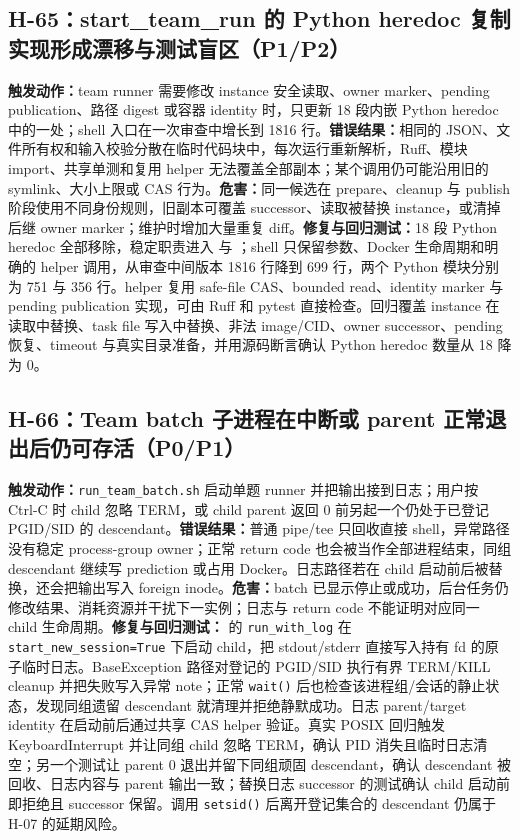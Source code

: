 \documentclass[11pt,a4paper,fontset=fandol]{ctexart}
\newcommand{\code}[1]{\texttt{#1}}
\begin{document}
\subsection{H-65：start\_team\_run 的 Python heredoc 复制实现形成漂移与测试盲区（P1/P2）}

\textbf{触发动作：}team runner 需要修改 instance 安全读取、owner marker、pending publication、路径 digest 或容器 identity 时，只更新 18 段内嵌 Python heredoc 中的一处；shell 入口在一次审查中增长到 1816 行。\textbf{错误结果：}相同的 JSON、文件所有权和输入校验分散在临时代码块中，每次运行重新解析，Ruff、模块 import、共享单测和复用 helper 无法覆盖全部副本；某个调用仍可能沿用旧的 symlink、大小上限或 CAS 行为。\textbf{危害：}同一候选在 prepare、cleanup 与 publish 阶段使用不同身份规则，旧副本可覆盖 successor、读取被替换 instance，或清掉后继 owner marker；维护时增加大量重复 diff。\textbf{修复与回归测试：}18 段 Python heredoc 全部移除，稳定职责进入  与 ；shell 只保留参数、Docker 生命周期和明确的 helper 调用，从审查中间版本 1816 行降到 699 行，两个 Python 模块分别为 751 与 356 行。helper 复用 safe-file CAS、bounded read、identity marker 与 pending publication 实现，可由 Ruff 和 pytest 直接检查。回归覆盖 instance 在读取中替换、task file 写入中替换、非法 image/CID、owner successor、pending 恢复、timeout 与真实目录准备，并用源码断言确认 Python heredoc 数量从 18 降为 0。

\subsection{H-66：Team batch 子进程在中断或 parent 正常退出后仍可存活（P0/P1）}

\textbf{触发动作：}\code{run\_team\_batch.sh} 启动单题 runner 并把输出接到日志；用户按 Ctrl-C 时 child 忽略 TERM，或 child parent 返回 0 前另起一个仍处于已登记 PGID/SID 的 descendant。\textbf{错误结果：}普通 pipe/tee 只回收直接 shell，异常路径没有稳定 process-group owner；正常 return code 也会被当作全部进程结束，同组 descendant 继续写 prediction 或占用 Docker。日志路径若在 child 启动前后被替换，还会把输出写入 foreign inode。\textbf{危害：}batch 已显示停止或成功，后台任务仍修改结果、消耗资源并干扰下一实例；日志与 return code 不能证明对应同一 child 生命周期。\textbf{修复与回归测试：} 的 \code{run\_with\_log} 在 \code{start\_new\_session=True} 下启动 child，把 stdout/stderr 直接写入持有 fd 的原子临时日志。BaseException 路径对登记的 PGID/SID 执行有界 TERM/KILL cleanup 并把失败写入异常 note；正常 \code{wait()} 后也检查该进程组/会话的静止状态，发现同组遗留 descendant 就清理并拒绝静默成功。日志 parent/target identity 在启动前后通过共享 CAS helper 验证。真实 POSIX 回归触发 KeyboardInterrupt 并让同组 child 忽略 TERM，确认 PID 消失且临时日志清空；另一个测试让 parent 0 退出并留下同组顽固 descendant，确认 descendant 被回收、日志内容与 parent 输出一致；替换日志 successor 的测试确认 child 启动前即拒绝且 successor 保留。调用 \code{setsid()} 后离开登记集合的 descendant 仍属于 H-07 的延期风险。
\end{document}

